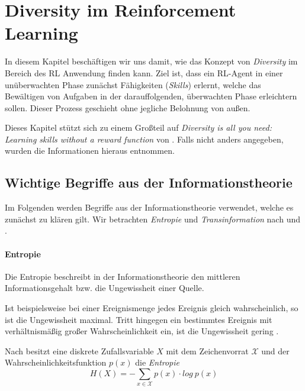 \section{Diversity im Reinforcement Learning}
\label{sec:diversity}
In diesem Kapitel beschäftigen wir uns damit, wie das Konzept von \textit{Diversity} im Bereich des RL Anwendung finden kann. Ziel ist, dass ein RL-Agent in einer unüberwachten Phase zunächst Fähigkeiten (\textit{Skills}) erlernt, welche das Bewältigen von Aufgaben in der darauffolgenden, überwachten Phase erleichtern sollen. Dieser Prozess geschieht ohne jegliche Belohnung von außen. 

Dieses Kapitel stützt sich zu einem Großteil auf \textit{Diversity is all you need: Learning skills without a reward function} von \citeauthor{diversity_eysenbach} \cite{diversity_eysenbach}. Falls nicht anders angegeben, wurden die Informationen hieraus entnommen.

\subsection{Wichtige Begriffe aus der Informationstheorie}
\label{sec:informationtheory}
Im Folgenden werden Begriffe aus der Informationstheorie verwendet, welche es zunächst zu klären gilt. Wir betrachten \textit{Entropie} und \textit{Transinformation} nach \cite{elements_cover} und \cite{information_werner}.

\paragraph{Entropie}

Die Entropie beschreibt in der Informationstheorie den mittleren Informationsgehalt bzw. die Ungewissheit einer Quelle.

Ist beispielsweise bei einer Ereignismenge jedes Ereignis gleich wahrscheinlich, so ist die Ungewissheit maximal. Tritt hingegen ein bestimmtes Ereignis mit verhältnismäßig großer Wahrscheinlichkeit ein, ist die Ungewissheit gering \cite{information_werner}.

Nach \cite{elements_cover} besitzt eine diskrete Zufallsvariable $ X $ mit dem Zeichenvorrat $ \mathcal{X} $ und der Wahrscheinlichkeitsfunktion $ p(x) $ die \textit{Entropie}
\begin{equation*}
    H(X) = -\sum_{x \in \mathcal{X}} p(x) \cdot log\ p(x) \label{eq:entropy}
\end{equation*}

